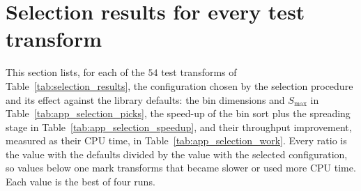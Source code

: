 \section{Selection results for every test transform}
\label{app:selection}

This section lists, for each of the $54$ test transforms of Table~\ref{tab:selection_results}, the configuration chosen by the selection procedure and its effect against the library defaults: the bin dimensions and $S_{\max}$ in Table~\ref{tab:app_selection_picks}, the speed-up of the bin sort plus the spreading stage in Table~\ref{tab:app_selection_speedup}, and their throughput improvement, measured as their CPU time, in Table~\ref{tab:app_selection_work}. Every ratio is the value with the defaults divided by the value with the selected configuration, so values below one mark transforms that became slower or used more CPU time. Each value is the best of four runs.

